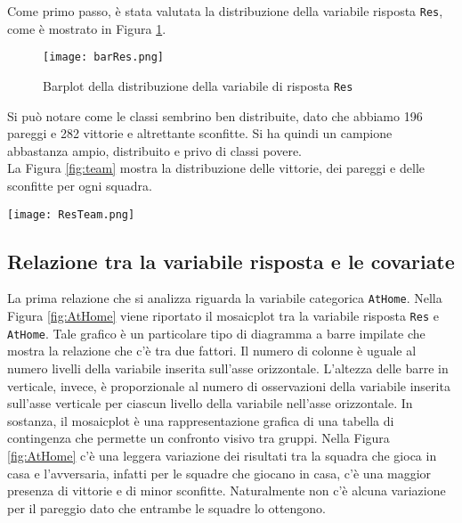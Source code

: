 Come primo passo, è stata valutata la distribuzione della variabile risposta \texttt{Res}, come è mostrato in Figura \ref{fig:res}.
\begin{figure}[htbp]
	\begin{center}
		\texttt{[image: barRes.png]}
		\caption{Barplot della distribuzione della variabile di risposta \texttt{Res}} \label{fig:res}
	\end{center}
\end{figure}
Si può notare come le classi sembrino ben distribuite, dato che abbiamo 196 pareggi e 282 vittorie e altrettante sconfitte. Si ha quindi un campione abbastanza ampio, distribuito e privo di classi povere.\\
La Figura \ref{fig:team} mostra la distribuzione delle vittorie, dei pareggi e delle sconfitte per ogni squadra.

\begin{sidewaysfigure} 
	\centering
	\begin{center}
		\texttt{[image: ResTeam.png]}
		\caption{Barplot della distribuzione della variabile di risposta per squadra\texttt{Res}} \label{fig:team}
	\end{center}
\end{sidewaysfigure} 


\subsection{Relazione tra la variabile risposta e le covariate}

La prima relazione che si analizza riguarda la variabile categorica \texttt{AtHome}. Nella Figura \ref{fig:AtHome} viene riportato il mosaicplot tra la variabile risposta \texttt{Res} e \texttt{AtHome}. Tale grafico è un particolare tipo di diagramma a barre impilate che mostra la relazione che c'è tra due fattori. Il numero di colonne è uguale al numero livelli della variabile inserita sull'asse orizzontale. L'altezza delle barre in verticale, invece, è proporzionale al numero di osservazioni della variabile inserita sull'asse verticale per ciascun livello della variabile nell'asse orizzontale.
In sostanza, il mosaicplot è una rappresentazione grafica di una tabella di contingenza che permette un confronto visivo tra gruppi. Nella Figura \ref{fig:AtHome} c'è una leggera variazione dei risultati tra la squadra che gioca in casa e l'avversaria, infatti per le squadre che giocano in casa, c'è una maggior presenza di vittorie e di minor sconfitte. Naturalmente non c'è alcuna variazione per il pareggio dato che entrambe le squadre lo ottengono.

